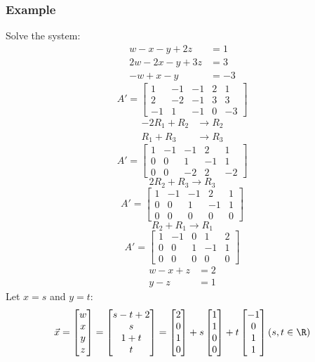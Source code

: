 \documentclass[letterpaper, 12pt]{math}
\begin{document}
\subsubsection*{Example}
Solve the system:
\begin{align*}
  w-x-y+2z &= 1 \\
  2w-2x-y+3z &= 3 \\
  -w+x-y &= -3
\end{align*}
\[ A' = \left[\begin{array}{cccc|c}
  1 & -1 & -1 & 2 & 1 \\
  2 & -2 & -1 & 3 & 3 \\
  -1 & 1 & -1 & 0 & -3
\end{array}\right] \]
\begin{align*}
  -2R_1+R_2 &\to R_2 \\
  R_1+R_3 &\to R_3
\end{align*}
\[ A' = \left[\begin{array}{cccc|c}
  1 & -1 & -1 & 2 & 1 \\
  0 & 0 & 1 & -1 & 1 \\
  0 & 0 & -2 & 2 & -2
\end{array}\right] \]
\[ 2R_2+R_3 \to R_3 \]
\[ A' = \left[\begin{array}{cccc|c}
  1 & -1 & -1 & 2 & 1 \\
  0 & 0 & 1 & -1 & 1 \\
  0 & 0 & 0 & 0 & 0
\end{array}\right] \]
\[ R_2+R_1 \to R_1 \]
\[ A' = \left[\begin{array}{cccc|c}
  1 & -1 & 0 & 1 & 2 \\
  0 & 0 & 1 & -1 & 1 \\
  0 & 0 & 0 & 0 & 0
\end{array}\right] \]
\begin{align*}
  w-x+z &= 2 \\
  y-z &= 1
\end{align*}
Let \( x = s \) and \( y = t \):
\[ \vec{x} = \begin{bmatrix}
  w \\ x \\ y \\ z
\end{bmatrix} = \begin{bmatrix}
  s-t+2 \\
  s \\
  1+t \\
  t
\end{bmatrix} = \begin{bmatrix}
  2 \\ 0 \\ 1 \\ 0
\end{bmatrix}+s\begin{bmatrix}
  1 \\ 1 \\ 0 \\ 0
\end{bmatrix}+t\begin{bmatrix}
  -1 \\ 0 \\ 1 \\ 1
\end{bmatrix} (s,t\in\R) \]
\end{document}
